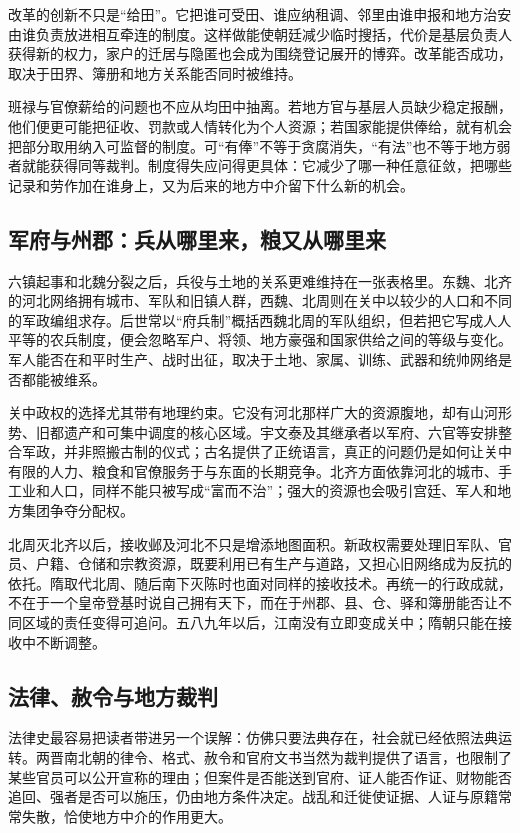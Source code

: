 \begin{turningpoint}
改革的创新不只是“给田”。它把谁可受田、谁应纳租调、邻里由谁申报和地方治安由谁负责放进相互牵连的制度。这样做能使朝廷减少临时搜括，代价是基层负责人获得新的权力，家户的迁居与隐匿也会成为围绕登记展开的博弈。改革能否成功，取决于田界、簿册和地方关系能否同时被维持。
\end{turningpoint}

班禄与官僚薪给的问题也不应从均田中抽离。若地方官与基层人员缺少稳定报酬，他们便更可能把征收、罚款或人情转化为个人资源；若国家能提供俸给，就有机会把部分取用纳入可监督的制度。可“有俸”不等于贪腐消失，“有法”也不等于地方弱者就能获得同等裁判。制度得失应问得更具体：它减少了哪一种任意征敛，把哪些记录和劳作加在谁身上，又为后来的地方中介留下什么新的机会。

\subsection{军府与州郡：兵从哪里来，粮又从哪里来}

六镇起事和北魏分裂之后，兵役与土地的关系更难维持在一张表格里。东魏、北齐的河北网络拥有城市、军队和旧镇人群，西魏、北周则在关中以较少的人口和不同的军政编组求存。后世常以“府兵制”概括西魏北周的军队组织，但若把它写成人人平等的农兵制度，便会忽略军户、将领、地方豪强和国家供给之间的等级与变化。军人能否在和平时生产、战时出征，取决于土地、家属、训练、武器和统帅网络是否都能被维系。

关中政权的选择尤其带有地理约束。它没有河北那样广大的资源腹地，却有山河形势、旧都遗产和可集中调度的核心区域。宇文泰及其继承者以军府、六官等安排整合军政，并非照搬古制的仪式；古名提供了正统语言，真正的问题仍是如何让关中有限的人力、粮食和官僚服务于与东面的长期竞争。北齐方面依靠河北的城市、手工业和人口，同样不能只被写成“富而不治”；强大的资源也会吸引宫廷、军人和地方集团争夺分配权。

北周灭北齐以后，接收邺及河北不只是增添地图面积。新政权需要处理旧军队、官员、户籍、仓储和宗教资源，既要利用已有生产与道路，又担心旧网络成为反抗的依托。隋取代北周、随后南下灭陈时也面对同样的接收技术。再统一的行政成就，不在于一个皇帝登基时说自己拥有天下，而在于州郡、县、仓、驿和簿册能否让不同区域的责任变得可追问。五八九年以后，江南没有立即变成关中；隋朝只能在接收中不断调整。

\subsection{法律、赦令与地方裁判}

法律史最容易把读者带进另一个误解：仿佛只要法典存在，社会就已经依照法典运转。两晋南北朝的律令、格式、赦令和官府文书当然为裁判提供了语言，也限制了某些官员可以公开宣称的理由；但案件是否能送到官府、证人能否作证、财物能否追回、强者是否可以施压，仍由地方条件决定。战乱和迁徙使证据、人证与原籍常常失散，恰使地方中介的作用更大。

